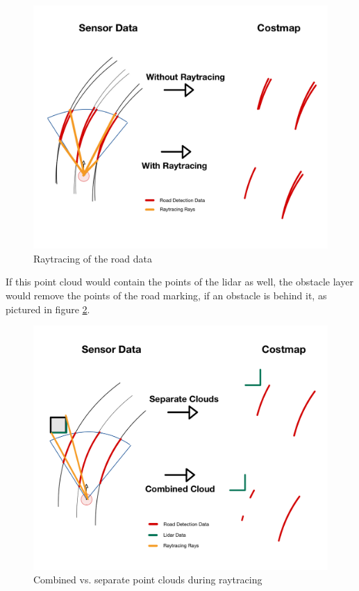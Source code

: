 \begin{figure} 
	\centering
	\includegraphics[width=.9\textwidth]{Pictures/raytracing road}
	\caption{Raytracing of the road data}
	\label{raytracing}
\end{figure}

If this point cloud would contain the points of the lidar as well, the obstacle layer would remove the points of the road marking, if an obstacle is behind it, as pictured in figure \ref{raytracing}.\\

\begin{figure} 
	\centering
	\includegraphics[width=.9\textwidth]{Pictures/raytracing}
	\caption{Combined vs. separate point clouds during raytracing}
	\label{raytracing}
\end{figure}

